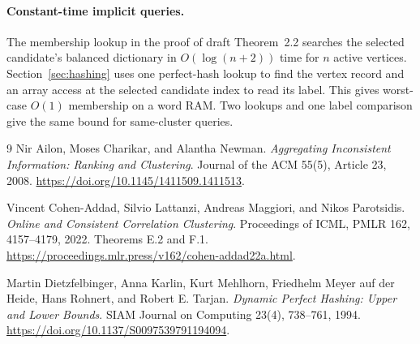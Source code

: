 \documentclass[11pt]{article}
\begin{document}
\paragraph{Constant-time implicit queries.}
The membership lookup in the proof of draft Theorem~2.2 searches the
selected candidate's balanced dictionary in $O(\log(n+2))$ time for
$n$ active vertices. Section~\ref{sec:hashing} uses one perfect-hash
lookup to find the vertex record and an array access at the selected
candidate index to read its label. This gives worst-case $O(1)$
membership on a word RAM. Two lookups and one label comparison give
the same bound for same-cluster queries.

\begin{thebibliography}{9}
Nir Ailon, Moses Charikar, and Alantha Newman.
\emph{Aggregating Inconsistent Information: Ranking and Clustering}.
Journal of the ACM 55(5), Article 23, 2008.
\url{https://doi.org/10.1145/1411509.1411513}.

Vincent Cohen-Addad, Silvio Lattanzi, Andreas Maggiori, and Nikos Parotsidis.
\emph{Online and Consistent Correlation Clustering}.
Proceedings of ICML, PMLR 162, 4157--4179, 2022.
Theorems E.2 and F.1.
\url{https://proceedings.mlr.press/v162/cohen-addad22a.html}.

Martin Dietzfelbinger, Anna Karlin, Kurt Mehlhorn, Friedhelm Meyer auf
der Heide, Hans Rohnert, and Robert E. Tarjan.
\emph{Dynamic Perfect Hashing: Upper and Lower Bounds}.
SIAM Journal on Computing 23(4), 738--761, 1994.
\url{https://doi.org/10.1137/S0097539791194094}.
\end{thebibliography}
\end{document}
